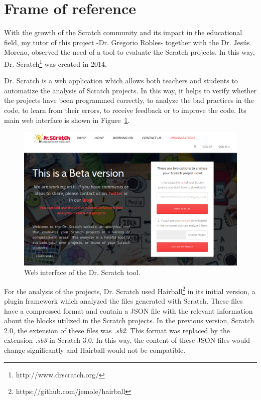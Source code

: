 \section{Frame of reference}
\label{sec:reference}

With the growth of the Scratch community and its impact in the educational field, my tutor of this project -Dr. Gregorio Robles- together with the Dr. Jesús Moreno, observed the need of a tool to evaluate the Scratch projects. In this way, Dr. Scratch\footnote{http://www.drscratch.org/} was created in 2014.

Dr. Scratch is a web application which allows both teachers and students to automatize the analysis of Scratch projects. In this way, it helps to verify whether the projects have been programmed correctly, to analyze the bad practices in the code, to learn from their errors, to receive feedback or to improve the code. Its main web interface is shown in Figure~\ref{fig:dr_scratch}.

\begin{figure}
  \centering
  \includegraphics[width=12cm, keepaspectratio]{img/dr_scratch.png}
  \caption{Web interface of the Dr. Scratch tool.}
  \label{fig:dr_scratch}
\end{figure}

For the analysis of the projects, Dr. Scratch used Hairball\footnote{https://github.com/jemole/hairball} in its initial version, a plugin framework which analyzed the files generated with Scratch. These files have a compressed format and contain a JSON file with the relevant information about the blocks utilized in the Scratch projects. In the previous version, Scratch 2.0, the extension of these files was \textit{.sb2}. This format was replaced by the extension \textit{.sb3} in Scratch 3.0. In this way, the content of these JSON files would change significantly and Hairball would not be compatible.

